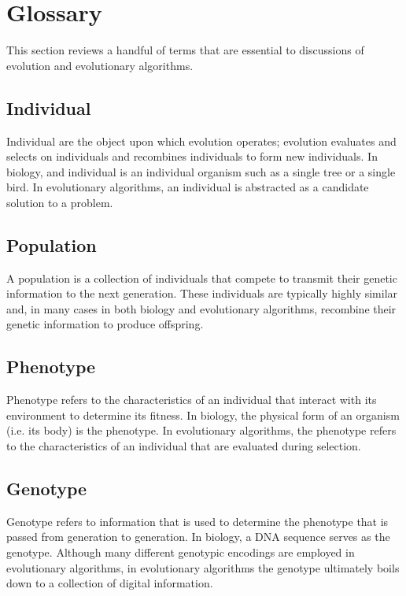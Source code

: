 \section{Glossary}

This section reviews a handful of terms that are essential to discussions of evolution and evolutionary algorithms.

\subsection{Individual}

Individual are the object upon which evolution operates; evolution evaluates and selects on individuals and recombines individuals to form new individuals. In biology, and individual is an individual organism such as a single tree or a single bird. In evolutionary algorithms, an individual is abstracted as a candidate solution to a problem.

\subsection{Population}

A population is a collection of individuals that compete to transmit their genetic information to the next generation. These individuals are typically highly similar and, in many cases in both biology and evolutionary algorithms, recombine their genetic information to produce offspring.

\subsection{Phenotype}

Phenotype refers to the characteristics of an individual that interact with its environment to determine its fitness. In biology, the physical form of an organism (i.e. its body) is the phenotype. In evolutionary algorithms, the phenotype refers to the characteristics of an individual that are evaluated during selection.

\subsection{Genotype}

Genotype refers to information that is used to determine the phenotype that is passed from generation to generation. In biology, a DNA sequence serves as the genotype. Although many different genotypic encodings are employed in evolutionary algorithms, in evolutionary algorithms the genotype ultimately boils down to a collection of digital information.

